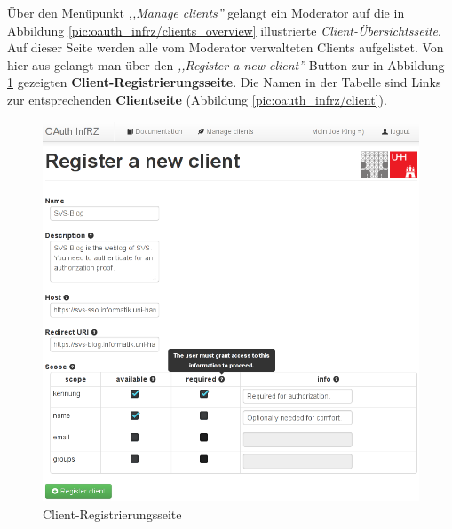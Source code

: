 \documentclass[12pt,a4paper,pointednumbers,abstracton]{scrartcl}
\begin{document}
Über den Menüpunkt \emph{,,Manage clients''} gelangt ein Moderator auf die in Abbildung \ref{pic:oauth_infrz/clients_overview} illustrierte \emph{Client-Übersichtsseite}.
Auf dieser Seite werden alle vom Moderator verwalteten Clients aufgelistet.
Von hier aus gelangt man über den \emph{,,Register a new client''}-Button zur in Abbildung \ref{pic:oauth_infrz/client_new} gezeigten \textbf{Client-Registrierungsseite}.
Die Namen in der Tabelle sind Links zur entsprechenden \textbf{Clientseite} (Abbildung \ref{pic:oauth_infrz/client}).

\begin{figure}[h!]
\centering
\includegraphics[width=15cm]{img/oauth_infrz/client_new}
\caption{Client-Registrierungsseite}
\label{pic:oauth_infrz/client_new}
\end{figure}
\end{document}
